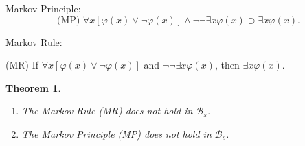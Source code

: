 \documentclass{asl}
\newtheorem{theorem}{Theorem}[section]
\theoremstyle{definition}
\begin{document}
Markov Principle:
\[\text{(MP)   } \forall x\left[\varphi(x)\vee \neg\varphi(x)\right] \wedge \neg\neg\exists x\varphi(x) \supset \exists x \varphi(x).\]

Markov Rule:

\begin{center}
(MR) If $\forall x\left[\varphi(x)\vee \neg\varphi(x)\right]$ and $\neg\neg\exists x\varphi(x)$, then $\exists x \varphi(x)$.
\end{center}

\begin{theorem}
\begin{enumerate}
\item The Markov Rule (MR) does not hold in $\mathcal{B}_s$.
\item The Markov Principle (MP) does not hold in $\mathcal{B}_s$.
\end{enumerate}
\label{theorem:MP}
\end{theorem}
\end{document}

